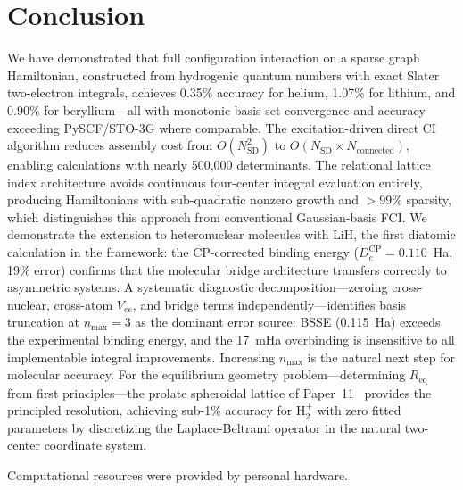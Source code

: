 \documentclass[aps,pra,twocolumn,superscriptaddress,longbibliography,floatfix]{revtex4-2}
\begin{document}
\section{Conclusion}
\label{sec:conclusion}

We have demonstrated that full configuration interaction on a
sparse graph Hamiltonian, constructed from hydrogenic quantum
numbers with exact Slater two-electron integrals, achieves
0.35\% accuracy for helium, 1.07\% for lithium, and 0.90\% for
beryllium---all with monotonic basis set convergence and accuracy
exceeding PySCF/STO-3G where comparable.
The excitation-driven direct CI algorithm reduces assembly cost
from $O(N_{\text{SD}}^2)$ to $O(N_{\text{SD}} \times N_{\text{connected}})$,
enabling calculations with nearly 500{,}000 determinants.
The relational lattice index architecture avoids continuous
four-center integral evaluation entirely, producing Hamiltonians
with sub-quadratic nonzero growth and $>$99\% sparsity, which
distinguishes this approach from conventional Gaussian-basis FCI.
We demonstrate the extension to heteronuclear molecules with LiH,
the first diatomic calculation in the framework: the CP-corrected
binding energy ($D_e^{\text{CP}} = 0.110$~Ha, 19\% error) confirms
that the molecular bridge architecture transfers correctly to
asymmetric systems. A systematic diagnostic decomposition---zeroing cross-nuclear,
cross-atom $V_{ee}$, and bridge terms independently---identifies basis
truncation at $n_{\max}=3$ as the dominant error source: BSSE (0.115~Ha)
exceeds the experimental binding energy, and the 17~mHa overbinding is
insensitive to all implementable integral improvements. Increasing
$n_{\max}$ is the natural next step for molecular accuracy.
For the equilibrium geometry problem---determining $R_{\mathrm{eq}}$
from first principles---the prolate spheroidal lattice of
Paper~11~\cite{loutey_paper11} provides the principled resolution,
achieving sub-1\% accuracy for H$_2^+$ with zero fitted parameters
by discretizing the Laplace-Beltrami operator in the natural
two-center coordinate system.

\begin{acknowledgments}
Computational resources were provided by personal hardware.
\end{acknowledgments}
\end{document}
